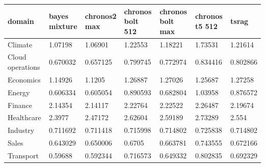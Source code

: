 \begin{tabular}{lllllll}
\toprule
domain & bayes mixture & chronos2 max & chronos bolt 512 & chronos bolt max & chronos t5 512 & tsrag \\
\midrule
Climate & 1.07198 & 1.06901 & 1.22553 & 1.18221 & 1.73531 & 1.21614 \\
Cloud operations & 0.670032 & 0.657125 & 0.799745 & 0.772974 & 0.834416 & 0.802866 \\
Economics & 1.14926 & 1.1205 & 1.26887 & 1.27026 & 1.25687 & 1.27258 \\
Energy & 0.606334 & 0.605054 & 0.890593 & 0.682804 & 1.03958 & 0.876572 \\
Finance & 2.14354 & 2.14117 & 2.22764 & 2.22522 & 2.26487 & 2.19674 \\
Healthcare & 2.3977 & 2.47172 & 2.62604 & 2.59189 & 2.73289 & 2.554 \\
Industry & 0.711692 & 0.711418 & 0.715998 & 0.714802 & 0.725838 & 0.714802 \\
Sales & 0.643029 & 0.650006 & 0.6705 & 0.663781 & 0.743555 & 0.672166 \\
Transport & 0.59688 & 0.592344 & 0.716573 & 0.649332 & 0.802835 & 0.692329 \\
\bottomrule
\end{tabular}
